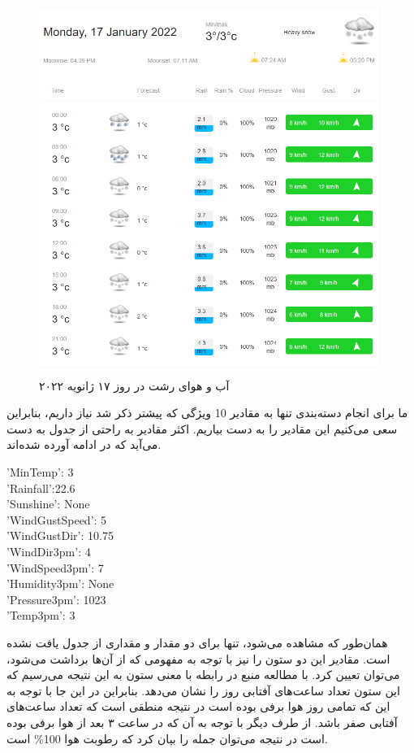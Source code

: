 \documentclass{article}
\begin{document}
\begin{figure}[h]
    \centering
    \includegraphics[scale=0.2]{images/q3/rasht.png}
    \caption{آب و هوای رشت در روز ۱۷ ژانویه ۲۰۲۲}
    \label{rasht}
\end{figure}

ما برای انجام دسته‌بندی تنها به مقادیر 10 ویژگی که پیشتر ذکر شد نیاز داریم، بنابراین سعی می‌کنیم
این مقادیر را به دست بیاریم. اکثر مقادیر به راحتی از جدول به دست می‌آید که در ادامه آورده شده‌اند.

\begin{latin}
    'MinTemp': 3 \\
    'Rainfall':22.6 \\
    'Sunshine': None \\
    'WindGustSpeed': 5 \\
    'WindGustDir': 10.75 \\
    'WindDir3pm': 4 \\
    'WindSpeed3pm': 7 \\
    'Humidity3pm': None \\
    'Pressure3pm': 1023 \\
    'Temp3pm': 3
\end{latin}

همان‌طور که مشاهده می‌شود، تنها برای دو مقدار  و  مقداری از جدول یافت نشده است.
مقادیر این دو ستون را نیز با توجه به مفهومی که از آن‌ها برداشت می‌شود، می‌توان تعیین کرد. با مطالعه منبع
 در رابطه با معنی ستون  به این نتیجه می‌رسیم که این ستون تعداد ساعت‌های آفتابی روز را
نشان می‌دهد. بنابراین در این جا با توجه به این که تمامی روز هوا برفی بوده است در نتیجه منطقی است که
تعداد ساعت‌های آفتابی صفر باشد. از طرف دیگر با توجه به آن که در ساعت ۳ بعد از هوا برفی بوده است
در نتیجه می‌توان جمله را بیان کرد که رطوبت هوا 100\% است.
\end{document}
